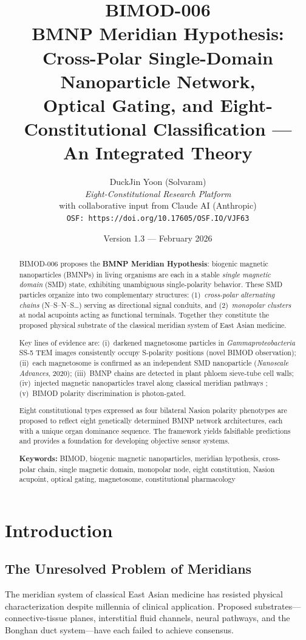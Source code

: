 \documentclass[12pt,a4paper]{article}
\title{
  \textbf{BIMOD-006} \\[0.5em]
  \Large BMNP Meridian Hypothesis: \\
  Cross-Polar Single-Domain Nanoparticle Network, \\
  Optical Gating, and Eight-Constitutional Classification --- \\
  An Integrated Theory
}
\author{
  DuckJin Yoon (Solvaram) \\
  \textit{Eight-Constitutional Research Platform} \\
  \small with collaborative input from Claude AI (Anthropic) \\
  \small \texttt{OSF: https://doi.org/10.17605/OSF.IO/VJF63}
}
\date{Version 1.3 --- February 2026}
\begin{document}
\maketitle

\begin{abstract}
BIMOD-006 proposes the \textbf{BMNP Meridian Hypothesis}: biogenic magnetic
nanoparticles (BMNPs) in living organisms are each in a stable
\emph{single magnetic domain} (SMD) state, exhibiting unambiguous
single-polarity behavior.  These SMD particles organize into two
complementary structures: (1)~\emph{cross-polar alternating chains}
(N--S--N--S\ldots) serving as directional signal conduits, and
(2)~\emph{monopolar clusters} at nodal acupoints acting as functional
terminals.  Together they constitute the proposed physical substrate of
the classical meridian system of East Asian medicine.

Key lines of evidence are: (i)~darkened magnetosome particles in
\textit{Gammaproteobacteria} SS-5 TEM images consistently occupy
S-polarity positions (novel BIMOD observation); (ii)~each magnetosome is
confirmed as an independent SMD nanoparticle
(\textit{Nanoscale Advances}, 2020); (iii)~BMNP chains are detected in
plant phloem sieve-tube cell walls; (iv)~injected magnetic nanoparticles
travel along classical meridian pathways \cite{johng2007}; (v)~BIMOD
polarity discrimination is photon-gated.

Eight constitutional types expressed as four bilateral Nasion polarity
phenotypes are proposed to reflect eight genetically determined BMNP
network architectures, each with a unique organ dominance sequence.
The framework yields falsifiable predictions and provides a foundation
for developing objective sensor systems.

\textbf{Keywords:} BIMOD, biogenic magnetic nanoparticles, meridian
hypothesis, cross-polar chain, single magnetic domain, monopolar node,
eight constitution, Nasion acupoint, optical gating, magnetosome,
constitutional pharmacology
\end{abstract}

\tableofcontents
\newpage

\section{Introduction}

\subsection{The Unresolved Problem of Meridians}
The meridian system of classical East Asian medicine has resisted
physical characterization despite millennia of clinical application.
Proposed substrates---connective-tissue planes, interstitial fluid
channels, neural pathways, and the Bonghan duct system---have each
failed to achieve consensus.
\end{document}
